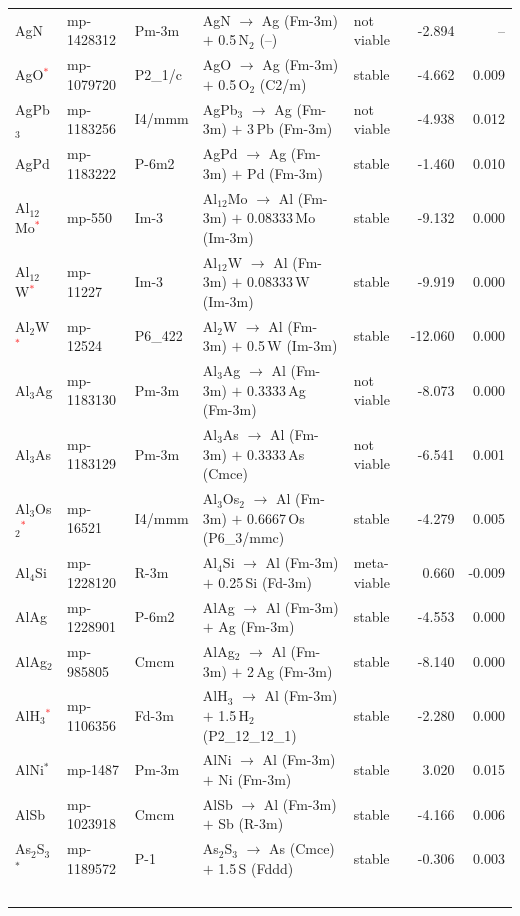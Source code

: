 \begin{longtable}{@{}ll l@{\hspace{4pt}} p{4.6cm} l@{\hspace{4pt}} rr@{}}
AgN & mp-1428312 & Pm-3m & AgN $\to$ Ag (Fm-3m) $+$ 0.5\,N$_{2}$ (--) & not viable & -2.894 & -- \\
AgO\textcolor{red}{$^*$} & mp-1079720 & P2\_1/c & AgO $\to$ Ag (Fm-3m) $+$ 0.5\,O$_{2}$ (C2/m) & stable & -4.662 & 0.009 \\
AgPb$_{3}$ & mp-1183256 & I4/mmm & AgPb$_{3}$ $\to$ Ag (Fm-3m) $+$ 3\,Pb (Fm-3m) & not viable & -4.938 & 0.012 \\
AgPd & mp-1183222 & P-6m2 & AgPd $\to$ Ag (Fm-3m) $+$ Pd (Fm-3m) & stable & -1.460 & 0.010 \\
Al$_{12}$Mo\textcolor{red}{$^*$} & mp-550 & Im-3 & Al$_{12}$Mo $\to$ Al (Fm-3m) $+$ 0.08333\,Mo (Im-3m) & stable & -9.132 & 0.000 \\
Al$_{12}$W\textcolor{red}{$^*$} & mp-11227 & Im-3 & Al$_{12}$W $\to$ Al (Fm-3m) $+$ 0.08333\,W (Im-3m) & stable & -9.919 & 0.000 \\
Al$_{2}$W\textcolor{red}{$^*$} & mp-12524 & P6\_422 & Al$_{2}$W $\to$ Al (Fm-3m) $+$ 0.5\,W (Im-3m) & stable & -12.060 & 0.000 \\
Al$_{3}$Ag & mp-1183130 & Pm-3m & Al$_{3}$Ag $\to$ Al (Fm-3m) $+$ 0.3333\,Ag (Fm-3m) & not viable & -8.073 & 0.000 \\
Al$_{3}$As & mp-1183129 & Pm-3m & Al$_{3}$As $\to$ Al (Fm-3m) $+$ 0.3333\,As (Cmce) & not viable & -6.541 & 0.001 \\
Al$_{3}$Os$_{2}$\textcolor{red}{$^*$} & mp-16521 & I4/mmm & Al$_{3}$Os$_{2}$ $\to$ Al (Fm-3m) $+$ 0.6667\,Os (P6\_3/mmc) & stable & -4.279 & 0.005 \\
Al$_{4}$Si & mp-1228120 & R-3m & Al$_{4}$Si $\to$ Al (Fm-3m) $+$ 0.25\,Si (Fd-3m) & meta-viable & 0.660 & -0.009 \\
AlAg & mp-1228901 & P-6m2 & AlAg $\to$ Al (Fm-3m) $+$ Ag (Fm-3m) & stable & -4.553 & 0.000 \\
AlAg$_{2}$ & mp-985805 & Cmcm & AlAg$_{2}$ $\to$ Al (Fm-3m) $+$ 2\,Ag (Fm-3m) & stable & -8.140 & 0.000 \\
AlH$_{3}$\textcolor{red}{$^*$} & mp-1106356 & Fd-3m & AlH$_{3}$ $\to$ Al (Fm-3m) $+$ 1.5\,H$_{2}$ (P2\_12\_12\_1) & stable & -2.280 & 0.000 \\
AlNi$^*$ & mp-1487 & Pm-3m & AlNi $\to$ Al (Fm-3m) $+$ Ni (Fm-3m) & stable & 3.020 & 0.015 \\
AlSb & mp-1023918 & Cmcm & AlSb $\to$ Al (Fm-3m) $+$ Sb (R-3m) & stable & -4.166 & 0.006 \\
As$_{2}$S$_{3}$$^*$ & mp-1189572 & P-1 & As$_{2}$S$_{3}$ $\to$ As (Cmce) $+$ 1.5\,S (Fddd) & stable & -0.306 & 0.003 \\
$$
\end{longtable}
